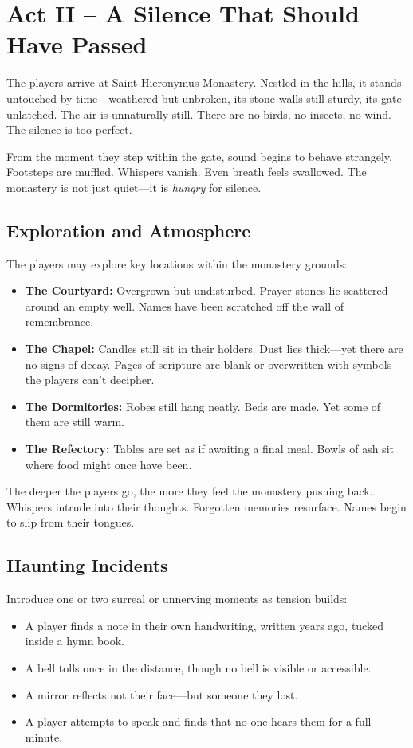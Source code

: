 \documentclass[nodeprecatedcode,bg=print]{dndbook/dndbook}
\begin{document}
\section*{Act II – A Silence That Should Have Passed}

The players arrive at Saint Hieronymus Monastery. Nestled in the hills, it stands untouched by time—weathered but unbroken, its stone walls still sturdy, its gate unlatched. The air is unnaturally still. There are no birds, no insects, no wind. The silence is too perfect.

From the moment they step within the gate, sound begins to behave strangely. Footsteps are muffled. Whispers vanish. Even breath feels swallowed. The monastery is not just quiet—it is \emph{hungry} for silence.


\subsection{Exploration and Atmosphere}

The players may explore key locations within the monastery grounds:
\begin{itemize}
    \item \textbf{The Courtyard:} Overgrown but undisturbed. Prayer stones lie scattered around an empty well. Names have been scratched off the wall of remembrance.
    \item \textbf{The Chapel:} Candles still sit in their holders. Dust lies thick—yet there are no signs of decay. Pages of scripture are blank or overwritten with symbols the players can’t decipher.
    \item \textbf{The Dormitories:} Robes still hang neatly. Beds are made. Yet some of them are still warm.
    \item \textbf{The Refectory:} Tables are set as if awaiting a final meal. Bowls of ash sit where food might once have been.
\end{itemize}

The deeper the players go, the more they feel the monastery pushing back. Whispers intrude into their thoughts. Forgotten memories resurface. Names begin to slip from their tongues.

\subsection{Haunting Incidents}

Introduce one or two surreal or unnerving moments as tension builds:
\begin{itemize}
    \item A player finds a note in their own handwriting, written years ago, tucked inside a hymn book.
    \item A bell tolls once in the distance, though no bell is visible or accessible.
    \item A mirror reflects not their face—but someone they lost.
    \item A player attempts to speak and finds that no one hears them for a full minute.
\end{itemize}
\end{document}
